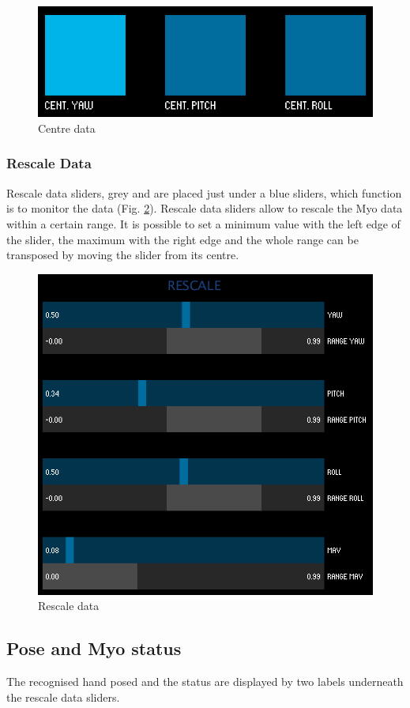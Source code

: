 \documentclass[12pt,a4paper]{article}
\begin{document}
		\begin{figure}[h]
			\centering
			\includegraphics[width=0.6\linewidth]{../images/MyoMapper-Centr}
			\caption{Centre data}
			\label{fig:MyoMapper-Centr}
		\end{figure}		
		
		\subsubsection*{Rescale Data}
		Rescale data sliders, grey and are placed just under a blue sliders, which function is to monitor the data (Fig. \ref{fig:MyoMapper-Rescale}).  Rescale data sliders allow to rescale the Myo data within a certain range. It is possible to set a minimum value with the left edge of the slider, the maximum with the right edge and the whole range can be transposed by moving the slider from its centre.
		
		\begin{figure}[h]
			\centering
			\includegraphics[width=0.6\linewidth]{../images/MyoMapper-Rescale}
			\caption{Rescale data}
			\label{fig:MyoMapper-Rescale}
		\end{figure}
	
	\subsection{Pose and Myo status}
	The recognised hand posed and the status are displayed by two labels underneath the rescale data sliders.
	
\end{document}
